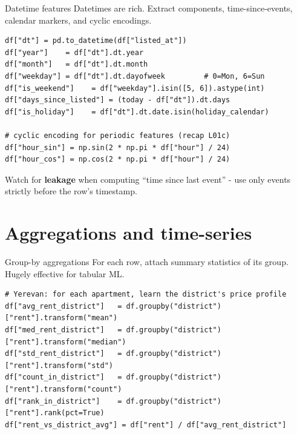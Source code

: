 \documentclass[aspectratio=169]{beamer}
\begin{document}
\begin{frame}[fragile]{Datetime features}
  Datetimes are rich. Extract components, time-since-events, calendar markers, and cyclic encodings.
  \vfill
{\lstset{basicstyle=\ttfamily\scriptsize}
\begin{lstlisting}
df["dt"] = pd.to_datetime(df["listed_at"])
df["year"]    = df["dt"].dt.year
df["month"]   = df["dt"].dt.month
df["weekday"] = df["dt"].dt.dayofweek         # 0=Mon, 6=Sun
df["is_weekend"]    = df["weekday"].isin([5, 6]).astype(int)
df["days_since_listed"] = (today - df["dt"]).dt.days
df["is_holiday"]    = df["dt"].dt.date.isin(holiday_calendar)

# cyclic encoding for periodic features (recap L01c)
df["hour_sin"] = np.sin(2 * np.pi * df["hour"] / 24)
df["hour_cos"] = np.cos(2 * np.pi * df["hour"] / 24)
\end{lstlisting}}
  \vfill
  \footnotesize Watch for \textbf{leakage} when computing ``time since last event'' - use only events strictly before the row's timestamp.
\end{frame}

\section{Aggregations and time-series}

\begin{frame}[fragile]{Group-by aggregations}
  For each row, attach summary statistics of its group. Hugely effective for tabular ML.
  \vfill
{\lstset{basicstyle=\ttfamily\scriptsize}
\begin{lstlisting}
# Yerevan: for each apartment, learn the district's price profile
df["avg_rent_district"]   = df.groupby("district")["rent"].transform("mean")
df["med_rent_district"]   = df.groupby("district")["rent"].transform("median")
df["std_rent_district"]   = df.groupby("district")["rent"].transform("std")
df["count_in_district"]   = df.groupby("district")["rent"].transform("count")
df["rank_in_district"]    = df.groupby("district")["rent"].rank(pct=True)
df["rent_vs_district_avg"] = df["rent"] / df["avg_rent_district"]
\end{lstlisting}}
  \vfill
\end{frame}
\end{document}
